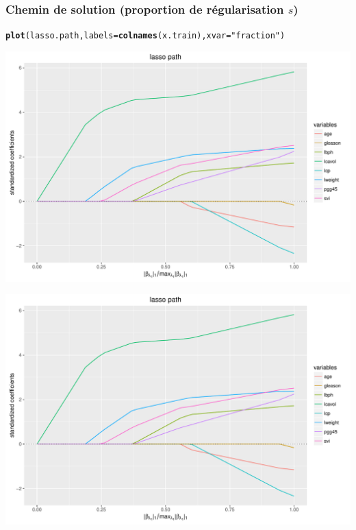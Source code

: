 \documentclass{beamer}\usepackage[]{graphicx}\usepackage[]{color}
\makeatletter
\newcommand{\hlstr}[1]{\textcolor[rgb]{0.192,0.494,0.8}{#1}}%
\newcommand{\hlstd}[1]{\textcolor[rgb]{0.345,0.345,0.345}{#1}}%
\newcommand{\hlkwc}[1]{\textcolor[rgb]{0.333,0.667,0.333}{#1}}%
\newcommand{\hlkwd}[1]{\textcolor[rgb]{0.737,0.353,0.396}{\textbf{#1}}}%
\newenvironment{kframe}{%
 \def\at@end@of@kframe{}%
 \ifinner\ifhmode%
  \def\at@end@of@kframe{\end{minipage}}%
  \begin{minipage}{\columnwidth}%
 \fi\fi%
 \def\FrameCommand##1{\hskip\@totalleftmargin \hskip-\fboxsep
 \colorbox{shadecolor}{##1}\hskip-\fboxsep
     \hskip-\linewidth \hskip-\@totalleftmargin \hskip\columnwidth}%
 \MakeFramed {\advance\hsize-\width
   \@totalleftmargin\z@ \linewidth\hsize
   \@setminipage}}%
 {\par\unskip\endMakeFramed%
 \at@end@of@kframe}
\newenvironment{knitrout}{}{} %
\makeatother
\begin{document}
\begin{frame}[containsverbatim]
  \frametitle{Chemin de solution (proportion de régularisation $s$)}

\begin{knitrout}\scriptsize
{}\color{fgcolor}\begin{kframe}
\begin{alltt}
\hlkwd{plot}\hlstd{(lasso.path,} \hlkwc{labels}\hlstd{=}\hlkwd{colnames}\hlstd{(x.train),} \hlkwc{xvar}\hlstd{=}\hlstr{"fraction"}\hlstd{)}
\end{alltt}
\end{kframe}
\includegraphics[width=\textwidth]{figures/lasso-unnamed-chunk-67-1} 

\includegraphics[width=\textwidth]{figures/lasso-unnamed-chunk-67-2} 

\end{knitrout}
\end{frame}
\end{document}
